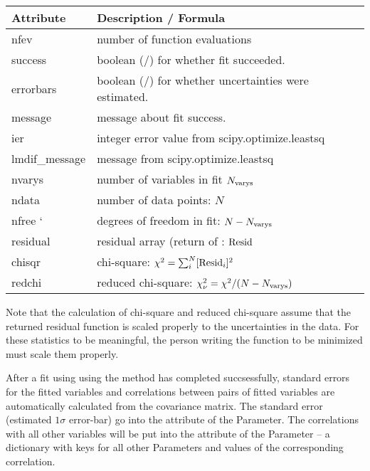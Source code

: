 \documentclass[letterpaper,10pt,english]{sphinxmanual}
\begin{document}
\begin{tabulary}{\linewidth}{|L|L|}
\hline
\textbf{
{\hyperref[fitting:Minimizer]{}}
Attribute
} & \textbf{
Description / Formula
}\\\hline

nfev
 & 
number of function evaluations
\\\hline

success
 & 
boolean (/) for whether fit succeeded.
\\\hline

errorbars
 & 
boolean (/) for whether uncertainties were estimated.
\\\hline

message
 & 
message about fit success.
\\\hline

ier
 & 
integer error value from scipy.optimize.leastsq
\\\hline

lmdif\_message
 & 
message from scipy.optimize.leastsq
\\\hline

nvarys
 & 
number of variables in fit  $N_{\rm varys}$
\\\hline

ndata
 & 
number of data points:  $N$
\\\hline

nfree {}`
 & 
degrees of freedom in fit:  $N - N_{\rm varys}$
\\\hline

residual
 & 
residual array (return of :  ${\rm Resid}$
\\\hline

chisqr
 & 
chi-square: $\chi^2 = \sum_i^N [{\rm Resid}_i]^2$
\\\hline

redchi
 & 
reduced chi-square: $\chi^2_{\nu}= {\chi^2} / {(N - N_{\rm varys})}$
\\\hline
\end{tabulary}


Note that the calculation of chi-square and reduced chi-square assume that the
returned residual function is scaled properly to the uncertainties in the data.
For these statistics to be meaningful, the person writing the function to
be minimized must scale them properly.

After a fit using using the {\hyperref[fitting:leastsq]{}} method has completed succsessfully,
standard errors for the fitted variables and correlations between pairs of
fitted variables are automatically calculated from the covariance matrix.
The standard error (estimated $1\sigma$ error-bar) go into the
{\hyperref[parameters:stderr]{}} attribute of the Parameter.  The correlations with all other
variables will be put into the {\hyperref[parameters:correl]{}} attribute of the Parameter --
a dictionary with keys for all other Parameters and values of the
corresponding correlation.
\end{document}
